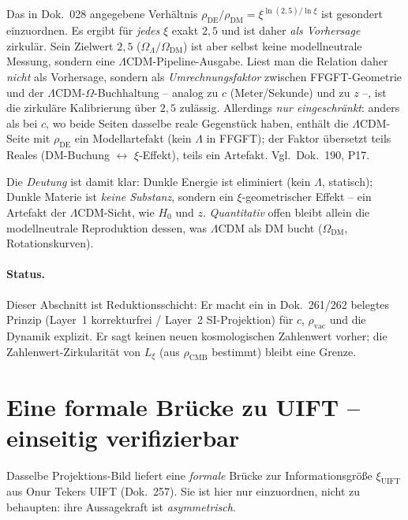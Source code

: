 Das in Dok.~028 angegebene Verhältnis
$\rho_{\text{DE}}/\rho_{\text{DM}}=\xi^{\ln(2{,}5)/\ln\xi}$ ist gesondert
einzuordnen. Es ergibt für \emph{jedes} $\xi$ exakt $2{,}5$ und ist daher
\emph{als Vorhersage} zirkulär. Sein Zielwert $2{,}5$
($\Omega_\Lambda/\Omega_{\text{DM}}$) ist aber selbst keine modellneutrale
Messung, sondern eine $\Lambda$CDM-Pipeline-Ausgabe. Liest man die Relation
daher \emph{nicht} als Vorhersage, sondern als \emph{Umrechnungsfaktor}
zwischen FFGFT-Geometrie und der $\Lambda$CDM-$\Omega$-Buchhaltung -- analog zu
$c$ (Meter/Sekunde) und zu $z$ --, ist die zirkuläre Kalibrierung über $2{,}5$
zulässig. Allerdings \emph{nur eingeschränkt}: anders als bei $c$, wo beide
Seiten dasselbe reale Gegenstück haben, enthält die $\Lambda$CDM-Seite mit
$\rho_{\text{DE}}$ ein Modellartefakt (kein $\Lambda$ in FFGFT); der Faktor
übersetzt teils Reales (DM-Buchung $\leftrightarrow$ $\xi$-Effekt), teils ein
Artefakt. Vgl.\ Dok.~190, P17.

Die \emph{Deutung} ist damit klar: Dunkle Energie ist eliminiert (kein
$\Lambda$, statisch); Dunkle Materie ist \emph{keine Substanz}, sondern ein
$\xi$-geometrischer Effekt -- ein Artefakt der $\Lambda$CDM-Sicht, wie $H_0$
und $z$. \emph{Quantitativ} offen bleibt allein die modellneutrale Reproduktion
dessen, was $\Lambda$CDM als DM bucht ($\Omega_{\text{DM}}$, Rotationskurven).

\paragraph{Status.} Dieser Abschnitt ist Reduktionsschicht: Er macht ein in
Dok.~261/262 belegtes Prinzip (Layer~1 korrekturfrei / Layer~2 SI-Projektion)
für $c$, $\rho_{\text{vac}}$ und die Dynamik explizit. Er sagt keinen neuen
kosmologischen Zahlenwert vorher; die Zahlenwert-Zirkularität von $L_\xi$
(aus $\rho_{\text{CMB}}$ bestimmt) bleibt eine Grenze.

\section{Eine formale Brücke zu UIFT -- einseitig verifizierbar}

Dasselbe Projektions-Bild liefert eine \emph{formale} Brücke zur
Informationsgröße $\xi_{\text{UIFT}}$ aus Onur Tekers UIFT (Dok.~257). Sie
ist hier nur einzuordnen, nicht zu behaupten: ihre Aussagekraft ist
\emph{asymmetrisch}.

